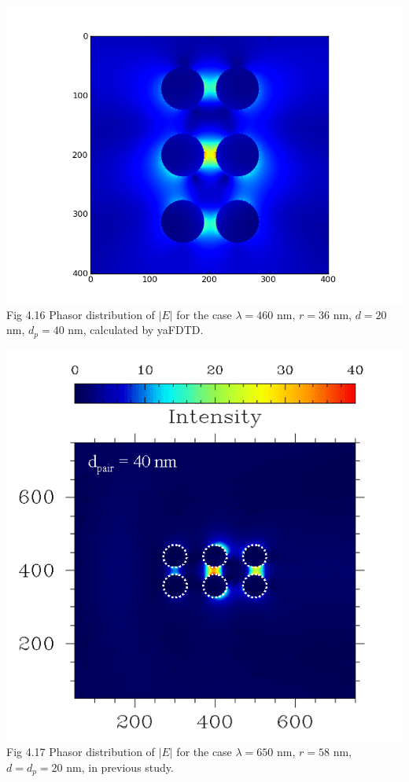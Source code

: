 \documentclass[openany]{book}
\begin{document}
\begin{center}
\includegraphics[scale=0.8]{images/etotal-d40.png}\\
Fig 4.16
Phasor distribution of $|E|$ for the case $\lambda = 460$ nm, $r = 36$ nm, $d = 20$ nm, $d_p = 40$ nm, calculated by yaFDTD.
\end{center}

\begin{center}
\includegraphics[scale=0.5]{images/d40.png}\\
Fig 4.17
Phasor distribution of $|E|$ for the case $\lambda = 650$ nm, $r = 58$ nm, $d = d_p = 20$ nm, in previous study.
\end{center}
\end{document}
